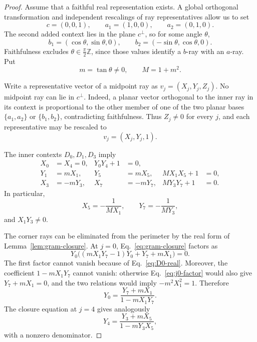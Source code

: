 \documentclass[twocolumn,aps,pra,floatfix,amsmath,amssymb,longbibliography]{revtex4-2}
\theoremstyle{definition}
\theoremstyle{remark}
\begin{document}
\begin{proof}
Assume that a faithful real representation exists.  A global orthogonal
transformation and independent rescalings of ray representatives allow
us to set
\begin{equation}
 c=(0,0,1),\qquad a_1=(1,0,0),\qquad a_2=(0,1,0).
 \label{eq:real-normal-a}
\end{equation}
The second added context lies in the plane $c^\perp$, so for some angle
$\theta$,
\begin{equation}
 b_1=(\cos\theta,\sin\theta,0),\qquad
 b_2=(-\sin\theta,\cos\theta,0).
 \label{eq:real-normal-b}
\end{equation}
Faithfulness excludes $\theta\in\frac{\pi}{2}\mathbb Z$, since those
values identify a $b$-ray with an $a$-ray.  Put
\begin{equation}
 m=\tan\theta\ne0,\qquad M=1+m^2.
 \label{eq:mM}
\end{equation}

Write a representative vector of a midpoint ray as
$v_j=(X_j,Y_j,Z_j)$.  No midpoint ray can lie in $c^\perp$.
Indeed, a planar vector orthogonal to the inner ray in its
context is proportional to the other member of one of the two planar
bases $\{a_1,a_2\}$ or $\{b_1,b_2\}$, contradicting faithfulness.
Thus $Z_j\ne0$ for every $j$, and each representative may be rescaled to
\begin{equation}
 v_j=(X_j,Y_j,1).
 \label{eq:affine-midpoints}
\end{equation}

The inner contexts $D_0,D_1,D_3$ imply
\begin{align}
 X_0&=X_4=0,&Y_0Y_4+1&=0,
 \label{eq:D0-real}\\
 Y_1&=mX_1,&Y_5&=mX_5,&MX_1X_5+1&=0,
 \label{eq:D1-real}\\
 X_3&=-mY_3,&X_7&=-mY_7,&MY_3Y_7+1&=0.
 \label{eq:D3-real}
\end{align}
In particular,
\begin{equation}
 X_5=-\frac1{MX_1},\qquad
 Y_7=-\frac1{MY_3},
 \label{eq:X5Y7}
\end{equation}
and $X_1Y_3\ne0$.

The corner rays can be eliminated from the perimeter by the real form
of Lemma~\ref{lem:gram-closure}.  At $j=0$,
Eq.~\eqref{eq:gram-closure} factors as
\begin{equation}
 Y_0\bigl((mX_1Y_7-1)Y_0+Y_7+mX_1\bigr)=0.
 \label{eq:j0-factor}
\end{equation}
The first factor cannot vanish because of Eq.~\eqref{eq:D0-real}.
Moreover, the coefficient $1-mX_1Y_7$ cannot vanish: otherwise
Eq.~\eqref{eq:j0-factor} would also give $Y_7+mX_1=0$, and the two
relations would imply $-m^2X_1^2=1$.  Therefore
\begin{equation}
 Y_0=\frac{Y_7+mX_1}{1-mX_1Y_7}.
 \label{eq:Y0-first}
\end{equation}
The closure equation at $j=4$ gives analogously
\begin{equation}
 Y_4=\frac{Y_3+mX_5}{1-mY_3X_5},
 \label{eq:Y4-first}
\end{equation}
with a nonzero denominator.


\end{proof}
\end{document}

